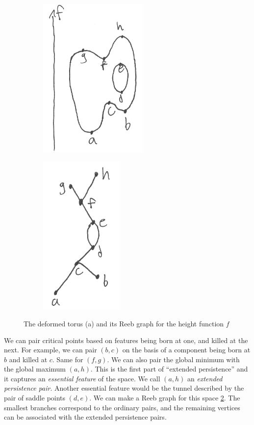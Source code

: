 \documentclass{article}
\begin{document}
\begin{figure}[htb!]
	\centering
	\begin{subfigure}{0.45\columnwidth}
		\centering
		\includegraphics[height=8cm]{fig/blobby-torus}
		\caption{\label{fig:deformed-torus}}
	\end{subfigure}
	\begin{subfigure}{0.45\columnwidth}
		\centering
		\includegraphics[height=8cm]{fig/blobby-torus-reeb-graph}
		\caption{\label{fig:reeb-graph}}
	\end{subfigure}
	\caption{\label{fig:torus-reeb} The deformed torus (a) and its Reeb graph for the
	height function $f$}
\end{figure}

We can pair critical points based on features being born at one, and killed at the next.
For example, we can pair $(b,c)$ on the basis of a component being born at $b$ and killed at $c$. Same for $(f,g)$. We can also pair the global minimum with the global maximum $(a,h)$. This is the first part of ``extended persistence'' and it captures an \emph{essential feature} of the space. We call $(a,h)$ an \emph{extended persistence pair}. Another essential feature would be the tunnel described by the pair of saddle points $(d,e)$.
We can make a Reeb graph for this space \cref{fig:reeb-graph}. The smallest branches correspond to the ordinary pairs, and the remaining vertices can be associated with the extended persistence pairs.
\end{document}
